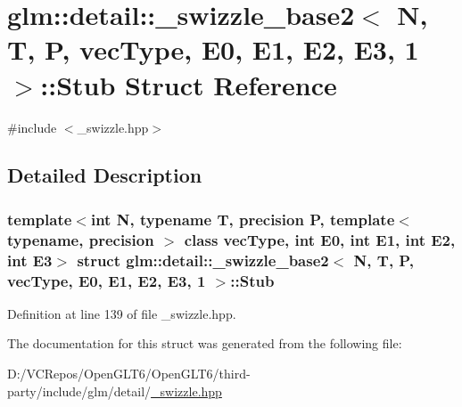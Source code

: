 \hypertarget{structglm_1_1detail_1_1__swizzle__base2_3_01_n_00_01_t_00_01_p_00_01vec_type_00_01_e0_00_01_e1_031fe02025030ffc83445bf43c5297f64}{}\section{glm\+::detail\+::\+\_\+swizzle\+\_\+base2$<$ N, T, P, vec\+Type, E0, E1, E2, E3, 1 $>$\+::Stub Struct Reference}
\label{structglm_1_1detail_1_1__swizzle__base2_3_01_n_00_01_t_00_01_p_00_01vec_type_00_01_e0_00_01_e1_031fe02025030ffc83445bf43c5297f64}


{\ttfamily \#include $<$\+\_\+swizzle.\+hpp$>$}



\subsection{Detailed Description}
\subsubsection*{template$<$int N, typename T, precision P, template$<$ typename, precision $>$ class vec\+Type, int E0, int E1, int E2, int E3$>$\newline
struct glm\+::detail\+::\+\_\+swizzle\+\_\+base2$<$ N, T, P, vec\+Type, E0, E1, E2, E3, 1 $>$\+::\+Stub}



Definition at line 139 of file \+\_\+swizzle.\+hpp.



The documentation for this struct was generated from the following file\+:\begin{DoxyCompactItemize}
\item 
D\+:/\+V\+C\+Repos/\+Open\+G\+L\+T6/\+Open\+G\+L\+T6/third-\/party/include/glm/detail/\mbox{\hyperlink{__swizzle_8hpp}{\+\_\+swizzle.\+hpp}}\end{DoxyCompactItemize}
